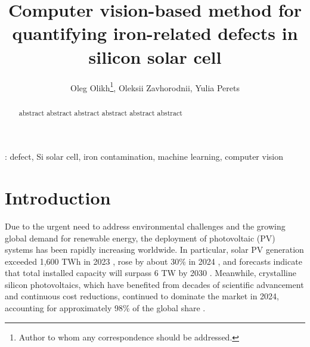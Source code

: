 \documentclass[10pt]{iopart}
\begin{document}
\title[Computer vision for quantifying Fe-related defects in Si solar cell]{Computer vision-based method for quantifying iron-related defects in silicon solar cell}

\author{Oleg Olikh\footnote{Author to whom any correspondence should be addressed.}, Oleksii Zavhorodnii, Yulia Perets}

\address{Taras Shevchenko National University of Kyiv, Kyiv 01601, Ukraine}


\begin{abstract}
abstract abstract abstract abstract abstract abstract
\end{abstract}

%
\vspace{2pc}
: defect, Si solar cell, iron contamination, machine learning, computer vision

\submitto{\SST}
%

\ioptwocol
%


\section{Introduction}\label{sec:Int}

Due to the urgent need to address environmental challenges and the growing global demand for renewable energy, the deployment of photovoltaic (PV) systems has been rapidly increasing worldwide.
In particular, solar PV generation exceeded 1,600 TWh in 2023 \cite{IEA2024Renewables, OSAMA2025}, rose by about 30\% in 2024 \cite{Prometheus2025}, and forecasts indicate that total installed capacity will surpass 6 TW by 2030 \cite{IEA2024Renewables}.
Meanwhile, crystalline silicon photovoltaics, which have benefited from decades of scientific advancement and continuous cost reductions, continued to dominate the market in 2024, accounting for approximately 98\% of the global share \cite{Fischer2025ITRPV, THOME2025}.
\end{document}

